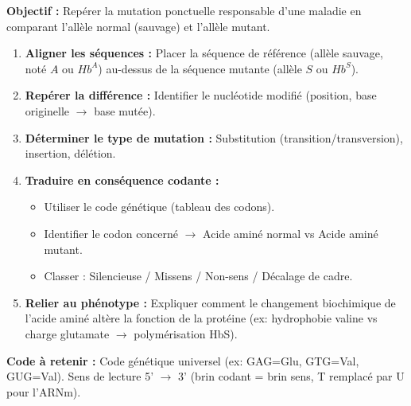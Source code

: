 \documentclass[11pt]{article}
\begin{document}
\begin{methode}
    \textbf{Objectif :} Repérer la mutation ponctuelle responsable d'une maladie en comparant l'allèle normal (sauvage) et l'allèle mutant.
    \begin{enumerate}
        \item \textbf{Aligner les séquences :} Placer la séquence de référence (allèle sauvage, noté $A$ ou $Hb^A$) au-dessus de la séquence mutante (allèle $S$ ou $Hb^S$).
        \item \textbf{Repérer la différence :} Identifier le nucléotide modifié (position, base originelle $\rightarrow$ base mutée).
        \item \textbf{Déterminer le type de mutation :} Substitution (transition/transversion), insertion, délétion.
        \item \textbf{Traduire en conséquence codante :}
              \begin{itemize}
                  \item Utiliser le code génétique (tableau des codons).
                  \item Identifier le codon concerné $\rightarrow$ Acide aminé normal vs Acide aminé mutant.
                  \item Classer : Silencieuse / Missens / Non-sens / Décalage de cadre.
              \end{itemize}
        \item \textbf{Relier au phénotype :} Expliquer comment le changement biochimique de l'acide aminé altère la fonction de la protéine (ex: hydrophobie valine vs charge glutamate $\rightarrow$ polymérisation HbS).
    \end{enumerate}
    \textbf{Code à retenir :} Code génétique universel (ex: GAG=Glu, GTG=Val, GUG=Val). Sens de lecture 5' $\rightarrow$ 3' (brin codant = brin sens, T remplacé par U pour l'ARNm).
\end{methode}
\end{document}

